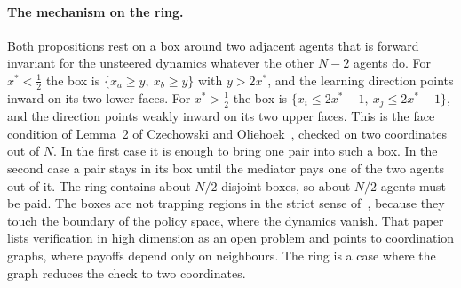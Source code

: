 \documentclass[11pt,a4paper]{article}
\theoremstyle{definition}
\theoremstyle{plain}
\newcommand{\xs}{x^{*}}
\begin{document}
\paragraph{The mechanism on the ring.}
Both propositions rest on a box around two adjacent agents that is forward invariant for the unsteered dynamics whatever the other $N-2$ agents do. For $\xs<\tfrac12$ the box is $\{x_a\ge y,\ x_b\ge y\}$ with $y>2\xs$, and the learning direction points inward on its two lower faces. For $\xs>\tfrac12$ the box is $\{x_i\le2\xs-1,\ x_j\le2\xs-1\}$, and the direction points weakly inward on its two upper faces. This is the face condition of Lemma~2 of Czechowski and Oliehoek~\cite{czechowski2023}, checked on two coordinates out of $N$. In the first case it is enough to bring one pair into such a box. In the second case a pair stays in its box until the mediator pays one of the two agents out of it. The ring contains about $N/2$ disjoint boxes, so about $N/2$ agents must be paid. The boxes are not trapping regions in the strict sense of~\cite{czechowski2023}, because they touch the boundary of the policy space, where the dynamics vanish. That paper lists verification in high dimension as an open problem and points to coordination graphs, where payoffs depend only on neighbours. The ring is a case where the graph reduces the check to two coordinates.
\end{document}
